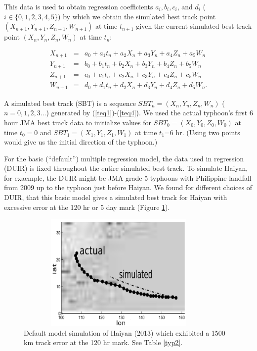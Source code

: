 \documentclass{SBCbookchapter}
\begin{document}
{\flushleft This} data is used to obtain regression coefficients $a_i,b_i,c_i$, and $d_i$  ($i\in\{0,1,2,3,4,5\}$) by which we  obtain the simulated best track point $(X_{n+1},Y_{n+1},Z_{n+1},W_{n+1})$ at time $t_{n+1}$ given the current simulated best track point  $(X_{n},Y_{n},Z_{n},W_{n})$ at time $t_n$:

\begin{eqnarray}
X_{n+1} & = & a_0 + a_1 t_n + a_2 X_n + a_3 Y_n + a_4 Z_n + a_5 W_n \label{teq1}\\
Y_{n+1} & = & b_0 + b_1 t_n + b_2 X_n + b_3 Y_n + b_4 Z_n + b_5 W_n \label{teq2}\\
Z_{n+1} & = & c_0 + c_1 t_n + c_2 X_n + c_3 Y_n + c_4 Z_n + c_5 W_n \label{teq3}\\
W_{n+1} & = & d_0 + d_1 t_n + d_2 X_n + d_3 Y_n + d_4 Z_n + d_5 W_n. \label{teq4}
\end{eqnarray}

  {\flushleft A} simulated best track (SBT) is a sequence  $SBT_{n}=(X_{n},Y_{n},Z_{n}, W_n)$ ($n=0,1,2,3...$) generated by (\ref{teq1})-(\ref{teq4}). We used the actual typhoon's first 6 hour JMA best track data to initialize values for  $SBT_{0} = (X_{0}, Y_{0}, Z_{0}, W_0)$ at time $t_0=0$ and $SBT_{1}=(X_{1},Y_{1},Z_{1}, W_1)$ at time $t_1$=6 hr. (Using two points would give us the initial direction of the typhoon.)

  For the basic (``default'') multiple regression model, the data used in regression (DUIR) is fixed throughout the entire simulated best track. To simulate Haiyan, for exacmple,  the DUIR might be JMA grade 5 typhoons with Philippine landfall from 2009 up to the typhoon just before Haiyan. We found for different choices of DUIR, that this basic model gives a simulated best track for Haiyan with excessive error at the 120 hr or 5 day mark (Figure \ref{haiyanbasic}).

\begin{figure}[h]
\hspace{1.2in} \includegraphics[width=4in, height=2.25in]{HaiyanTrackDefault.png}
 \caption{Default model simulation of Haiyan (2013) which exhibited a 1500 km track error at the 120 hr mark. See Table \ref{typ2}. }
 \centering
 \label{haiyanbasic}
\end{figure}
\end{document}
